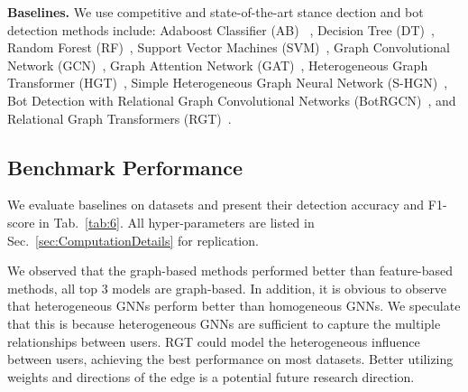 \documentclass[10pt,twocolumn,letterpaper]{article}
\begin{document}
\noindent
\textbf{Baselines.}
We use competitive and state-of-the-art stance dection and bot detection methods include: Adaboost Classifier (AB) ~\cite{Alpher57}, Decision Tree (DT)~\cite{Alpher60}, Random Forest (RF)~\cite{Alpher59}, Support Vector Machines (SVM)~\cite{Alpher61}, Graph Convolutional Network (GCN)~\cite{Alpher42}, Graph Attention Network (GAT)~\cite{Alpher20}, Heterogeneous Graph Transformer (HGT)~\cite{Alpher55}, Simple Heterogeneous Graph Neural Network (S-HGN)~\cite{Alpher56}, Bot Detection with Relational Graph Convolutional Networks (BotRGCN)~\cite{Alpher06}, and Relational Graph Transformers (RGT)~\cite{Alpher44}.


\subsection{Benchmark Performance}
\label{sec:benchmarkPerformance}
We evaluate baselines on datasets and present their detection accuracy and F1-score in Tab.~\ref{tab:6}. All hyper-parameters are listed in Sec.~\ref{sec:ComputationDetails} for replication.

We observed that the graph-based methods performed better than feature-based methods, all top 3 models are graph-based. In addition, it is obvious to observe that heterogeneous GNNs perform better than homogeneous GNNs. We speculate that this is because heterogeneous GNNs are sufficient to capture the multiple relationships between users.
RGT could model the heterogeneous influence between users, achieving the best performance on most datasets. Better utilizing weights and directions of the edge is a potential future research direction.
\end{document}

